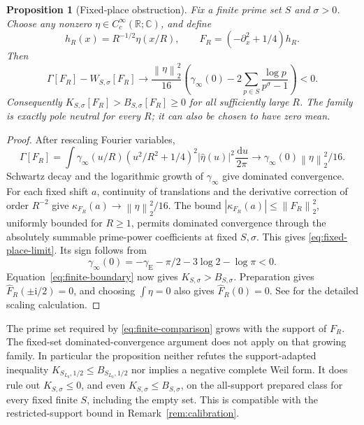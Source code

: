 \documentclass[11pt]{article}
\numberwithin{equation}{section}
\newtheorem{proposition}[theorem]{Proposition}
\theoremstyle{definition}
\theoremstyle{remark}
\newcommand{\ii}{\mathrm i}
\newcommand{\norm}[1]{\left\lVert #1\right\rVert}
\newcommand{\dd}{\,\mathrm d}
\begin{document}
\begin{proposition}[Fixed-place obstruction]\label{prop:fixed-place-obstruction}
Fix a finite prime set \(S\) and \(\sigma>0\). Choose any nonzero
\(\eta\in C_c^\infty(\mathbb R;\mathbb C)\), and define
\[
h_R(x)=R^{-1/2}\eta(x/R),\qquad
F_R=(-\partial_x^2+1/4)h_R.
\]
Then
\begin{equation}\label{eq:fixed-place-limit}
\Gamma[F_R]-W_{S,\sigma}[F_R]
\longrightarrow\frac{\norm\eta_2^2}{16}
\left(\gamma_\infty(0)
-2\sum_{p\in S}\frac{\log p}{p^\sigma-1}\right)<0.
\end{equation}
Consequently \(K_{S,\sigma}[F_R]>B_{S,\sigma}[F_R]\ge0\)
for all sufficiently large \(R\). The family is exactly pole neutral
for every \(R\); it can also be chosen to have zero mean.
\end{proposition}
\begin{proof}
After rescaling Fourier variables,
\[
\Gamma[F_R]=\int\gamma_\infty(u/R)
(u^2/R^2+1/4)^2|\widehat\eta(u)|^2\frac{\dd u}{2\pi}
\longrightarrow \gamma_\infty(0)\norm\eta_2^2/16.
\]
Schwartz decay and the logarithmic growth of \(\gamma_\infty\)
give dominated convergence. For each fixed shift \(a\), continuity
of translations and the derivative correction of order \(R^{-2}\)
give \(\kappa_{F_R}(a)\to\norm\eta_2^2/16\).
The bound \(|\kappa_{F_R}(a)|\le\norm{F_R}_2^2\), uniformly
bounded for \(R\ge1\), permits dominated convergence through the
absolutely summable prime-power coefficients at fixed \(S,\sigma\).
This gives \eqref{eq:fixed-place-limit}. Its sign follows from
\[
\gamma_\infty(0)=-\gamma_{\mathrm E}-\pi/2-3\log2-\log\pi<0.
\]
Equation~\eqref{eq:finite-boundary} now gives \(K_{S,\sigma}>B_{S,\sigma}\).
Preparation gives \(\widehat F_R(\pm\ii/2)=0\), and choosing
\(\int\eta=0\) also gives \(\widehat F_R(0)=0\).
See \cite[Section 6]{FiniteEulerNote} for the detailed scaling calculation.
\end{proof}

The prime set required by \eqref{eq:finite-comparison} grows with
the support of \(F_R\). The fixed-set dominated-convergence argument
does not apply on that growing family. In particular the proposition
neither refutes the support-adapted inequality \(K_{S_{L_0},1/2}\le
B_{S_{L_0},1/2}\) nor implies a negative complete Weil form.
It does rule out \(K_{S,\sigma}\le0\), and even \(K_{S,\sigma}\le
B_{S,\sigma}\), on the all-support prepared class for every fixed
finite \(S\), including the empty set. This is compatible with the
restricted-support bound in Remark~\ref{rem:calibration}.
\end{document}
